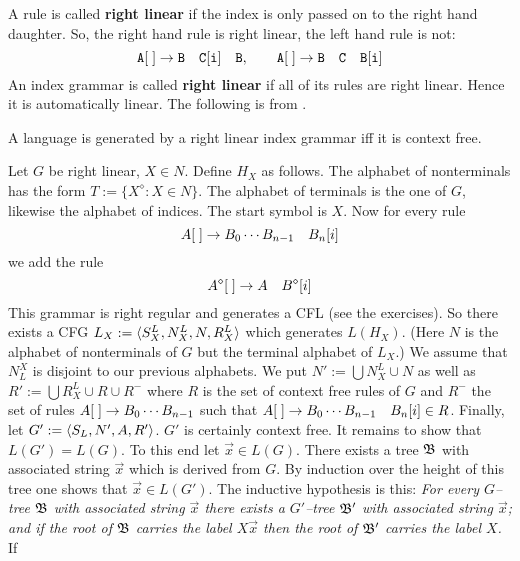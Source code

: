 A rule is called \textbf{right linear} if the index is only passed
on to the right hand daughter. So, the right hand rule is
right linear, the left hand rule is not:
\begin{equation}
\mbox{\tt A}[\;] \rightarrow \mbox{\tt B}\quad \mbox{\tt C}[\mbox{\tt i}]
\quad \mbox{\tt B}, \qquad \mbox{\tt A}[\; ] \rightarrow \mbox{\tt B}\quad
\mbox{\tt C}\quad \mbox{\tt B}[\mbox{\tt i}]
\end{equation}
An index grammar is called \textbf{right linear} if all of its
rules are right linear. Hence it is automatically linear.
The following is from 
\cite{michaelis_wartena:fg97,michaelis_wartena:csli-ligs}. 
\begin{thm}
A language is generated by a right linear index grammar iff
it is context free.
\end{thm}
\proofbeg
Let $G$ be right linear, $X \in N$. Define $H_X$ as follows. The
alphabet of nonterminals has the form $T := \{X^{\diamond} :
X \in N\}$. The alphabet of terminals is the one of $G$, likewise
the alphabet of indices. The start symbol is $X$. Now for every
rule
\begin{equation}
A[\;] \rightarrow B_0 \dotsb B_{n-1}\quad B_n[i]
\end{equation}
we add the rule
\begin{equation}
A^{\diamond}[\;] \rightarrow A \quad B^{\diamond}[i]
\end{equation}
This grammar is right regular and generates a CFL (see the 
exercises). So there exists a CFG
$L_X := \langle S_X^L, N_X^L, N, R_X^L\rangle$ which generates $L(H_X)$.
(Here $N$ is the alphabet of nonterminals of $G$ but the terminal
alphabet of $L_X$.) We assume that $N^X_L$ is disjoint to our
previous alphabets. We put $N' := \bigcup N_X^L \cup N$ as well as
$R' := \bigcup R_X^L \cup R \cup R^-$ where $R$ is the set of
context free rules of $G$ and $R^-$ the set of rules
$A[\;] \rightarrow B_0 \dotsb B_{n-1}$ such that
$A[\;] \rightarrow B_0 \dotsb B_{n-1}\quad B_n[i] \in R$.
Finally, let $G' := \langle S_L, N', A, R'\rangle$.
$G'$ is certainly context free. It remains to show that
$L(G') = L(G)$. To this end let $\vec{x} \in L(G)$. There exists
a tree $\mathfrak{B}$ with associated string $\vec{x}$ which is derived
from $G$. By induction over the height of this tree one shows that
$\vec{x} \in L(G')$. The inductive hypothesis is this:
{\it For every $G$--tree $\mathfrak{B}$ with associated string $\vec{x}$
there exists a $G'$--tree $\mathfrak{B}'$ with associated string
$\vec{x}$; and if the root of $\mathfrak{B}$ carries the label
$X\vec{x}$ then the root of $\mathfrak{B}'$ carries the label $X$.} If
